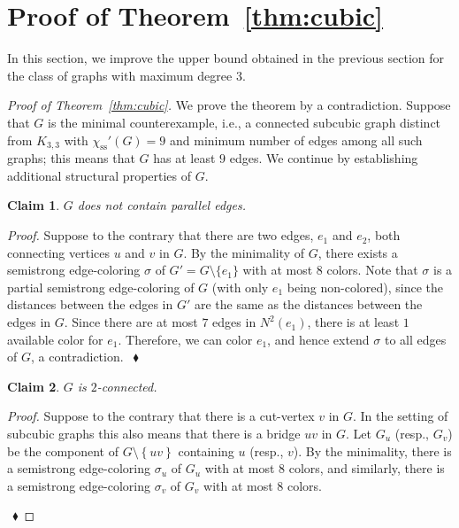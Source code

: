 \documentclass[12pt,a4paper]{article}
\newtheorem{claim}{Claim}
\newcommand{\set}[1]{\ensuremath{\left\{#1 \right\}}}
\newcommand{\chiss}[1]{\ensuremath{\chi_{\mathrm{ss}}'(#1)}}
\newenvironment{proofclaim}[1][]%
    {\noindent \emph{Proof.} {}{#1}{}}{$~$\hfill $~\blacklozenge$ \vspace{0.2cm}}
\begin{document}
\section{Proof of Theorem~\ref{thm:cubic}}
\label{sec:cubic}

In this section, we improve the upper bound obtained in the previous section for the class of graphs with maximum degree $3$.
\begin{proof}[Proof of Theorem~\ref{thm:cubic}]
	We prove the theorem by a contradiction. 
	Suppose that $G$ is the minimal counterexample, i.e., a connected subcubic graph distinct from $K_{3,3}$ with $\chiss{G} = 9$ 
	and minimum number of edges among all such graphs; this means that $G$ has at least $9$ edges. 
	We continue by establishing additional structural properties of $G$.
	
	\begin{claim}
		\label{cl:multi}
		$G$ does not contain parallel edges.
	\end{claim}
	
	\begin{proofclaim}
		Suppose to the contrary that there are two edges, $e_1$ and $e_2$, both connecting vertices $u$ and $v$ in $G$. 
		By the minimality of $G$, there exists a semistrong edge-coloring $\sigma$ of $G' = G \setminus \{e_1\}$ with at most $8$ colors.
		Note that $\sigma$ is a partial semistrong edge-coloring of $G$ (with only $e_1$ being non-colored),
		since the distances between the edges in $G'$ are the same as the distances between the edges in $G$.
		Since there are at most $7$ edges in $N^2(e_1)$, there is at least $1$ available color for $e_1$.
		Therefore, we can color $e_1$, and hence extend $\sigma$ to all edges of $G$, a contradiction.
	\end{proofclaim}

	\begin{claim}
		\label{cl:bridge}
		$G$ is $2$-connected.
	\end{claim}
	
	\begin{proofclaim}
		Suppose to the contrary that there is a cut-vertex $v$ in $G$.
		In the setting of subcubic graphs this also means that there is a bridge $uv$ in $G$.
		Let $G_u$ (resp., $G_v$) be the component of $G\setminus \set{uv}$ containing $u$ (resp., $v$).
		By the minimality, there is a semistrong edge-coloring $\sigma_u$ of $G_u$ with at most $8$ colors, 
		and similarly, there is a semistrong edge-coloring $\sigma_v$ of $G_v$ with at most $8$ colors.
		

\end{proofclaim}
\end{proof}
\end{document}
